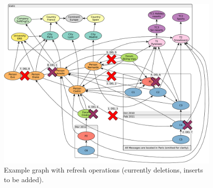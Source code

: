 \begin{figure}[ht]
    \centering
    \includegraphics[scale=\yedscale]{figures/example-graph-with-refreshes}
    \caption{Example graph with refresh operations (currently deletions, inserts to be added).}
    \label{fig:example-graph-with-refreshes}
\end{figure}
